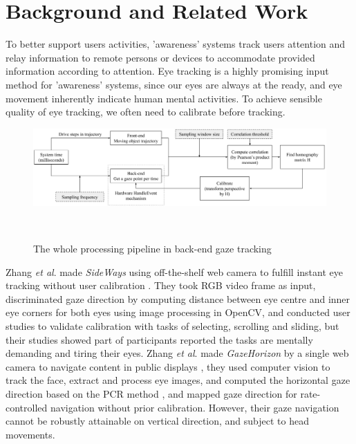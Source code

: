 \documentclass{sigchi}
\begin{document}
\section{Background and Related Work}

To better support user\textquotesingle s activities, 'awareness' systems \cite{vertegaal2003attentive} track user\textquotesingle s attention and relay information to remote persons or devices to accommodate provided information according to attention. Eye tracking is a highly promising input method for 'awareness' systems, since our eyes are always at the ready, and eye movement inherently indicate human mental activities. To achieve sensible quality of eye tracking, we often need to calibrate before tracking.
\begin{figure}[h!]
  \centering
  \includegraphics[width=2\columnwidth]{figures/Processing_Pipeline}\\
\caption{The whole processing pipeline in back-end gaze tracking}~\label{fig:figure2}
\end{figure}
Zhang \textit{et al}. made \textit{SideWays} using off-the-shelf web camera to fulfill instant eye tracking without user calibration \cite{zhang2013sideways}. They took RGB video frame as input, discriminated gaze direction by computing distance between eye centre and inner eye corners for both eyes using image processing in OpenCV, and conducted user studies to validate calibration with tasks of selecting, scrolling and sliding, but their studies showed part of participants reported the tasks are mentally demanding and tiring their eyes. Zhang \textit{et al}. made \textit{GazeHorizon} by a single web camera to navigate content in public displays \cite{zhang2015eye}\cite{zhang2014gazehorizon}, they used computer vision to track the face, extract and process eye images, and computed the horizontal gaze direction based on the PCR method \cite{zhang2013sideways}\cite{zhang2014pupil}, and mapped gaze direction for rate-controlled navigation without prior calibration. However, their gaze navigation cannot be robustly attainable on vertical direction, and subject to head movements.
\end{document}
